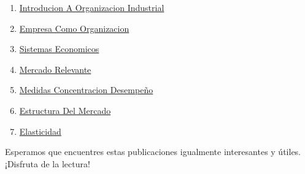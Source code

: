 \documentclass[
  doc,
  floatsintext,
  longtable,
  a4paper,
  nolmodern,
  notxfonts,
  notimes,
  colorlinks=true,linkcolor=blue,citecolor=blue,urlcolor=blue]{apa7}
\providecommand{\tightlist}{%
  \setlength{\itemsep}{0pt}\setlength{\parskip}{0pt}}
\begin{document}
\begin{enumerate}
\def\labelenumi{\arabic{enumi}.}
\tightlist
\item
  \href{https://achalmaedison.netlify.app/microeconomia/organizacion-industrial/2023-06-12-introducion-a-organizacion-industrial/index.pdf}{}
  \href{https://achalmaedison.netlify.app/microeconomia/organizacion-industrial/2023-06-12-introducion-a-organizacion-industrial}{Introducion
  A Organizacion Industrial}
\item
  \href{https://achalmaedison.netlify.app/microeconomia/organizacion-industrial/2023-06-13-empresa-como-organizacion/index.pdf}{}
  \href{https://achalmaedison.netlify.app/microeconomia/organizacion-industrial/2023-06-13-empresa-como-organizacion}{Empresa
  Como Organizacion}
\item
  \href{https://achalmaedison.netlify.app/microeconomia/organizacion-industrial/2023-06-13-sistemas-economicos/index.pdf}{}
  \href{https://achalmaedison.netlify.app/microeconomia/organizacion-industrial/2023-06-13-sistemas-economicos}{Sistemas
  Economicos}
\item
  \href{https://achalmaedison.netlify.app/microeconomia/organizacion-industrial/2023-06-15-mercado-relevante/index.pdf}{}
  \href{https://achalmaedison.netlify.app/microeconomia/organizacion-industrial/2023-06-15-mercado-relevante}{Mercado
  Relevante}
\item
  \href{https://achalmaedison.netlify.app/microeconomia/organizacion-industrial/2023-06-16-medidas-concentracion-desempeño/index.pdf}{}
  \href{https://achalmaedison.netlify.app/microeconomia/organizacion-industrial/2023-06-16-medidas-concentracion-desempeño}{Medidas
  Concentracion Desempeño}
\item
  \href{https://achalmaedison.netlify.app/microeconomia/organizacion-industrial/2023-06-17-estructura-del-mercado/index.pdf}{}
  \href{https://achalmaedison.netlify.app/microeconomia/organizacion-industrial/2023-06-17-estructura-del-mercado}{Estructura
  Del Mercado}
\item
  \href{https://achalmaedison.netlify.app/microeconomia/organizacion-industrial/2023-06-23-elasticidad/index.pdf}{}
  \href{https://achalmaedison.netlify.app/microeconomia/organizacion-industrial/2023-06-23-elasticidad}{Elasticidad}
\end{enumerate}

Esperamos que encuentres estas publicaciones igualmente interesantes y
útiles. ¡Disfruta de la lectura!
\end{document}
